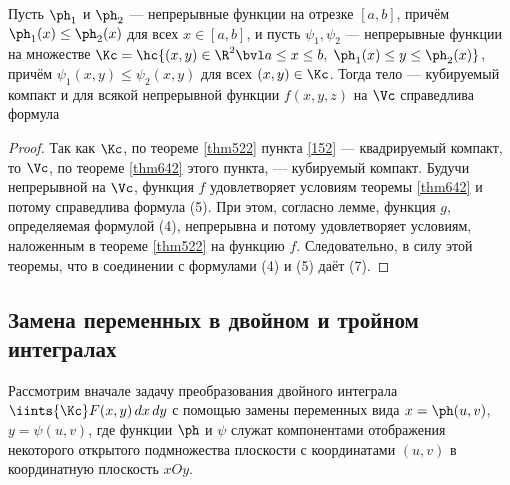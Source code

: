\documentclass[a4paper]{article}
\begin{document}
\begin{theorem}
Пусть $\ph_1$ и $\ph_2$ --- непрерывные функции на отрезке $[a,b]$,
причём $\ph_1(x)\le\ph_2(x)$ для всех $x\in[a,b]$, и пусть
$\psi_1,\psi_2$ --- непрерывные функции на множестве
$\Kc=\hc{(x,y)\in\R^2 \bvl a\le x\le b, \; \ph_1(x)\le
y\le\ph_2(x)}$, причём $\psi_1(x,y)\le\psi_2(x,y)$ для всех
$(x,y)\in\Kc$. Тогда тело 
--- кубируемый компакт и для всякой непрерывной функции $f(x,y,z)$
на $\Vc$ справедлива формула
\end{theorem}

\begin{proof}
Так как $\Kc$, по теореме \ref{thm522} пункта \ref{152} ---
квадрируемый компакт, то $\Vc$, по теореме \ref{thm642} этого
пункта, --- кубируемый компакт. Будучи непрерывной на $\Vc$, функция
$f$ удовлетворяет условиям теоремы \ref{thm642} и потому справедлива
формула (5). При этом, согласно лемме, функция $g$, определяемая
формулой (4), непрерывна и потому удовлетворяет условиям, наложенным
в теореме \ref{thm522} на функцию $f$. Следовательно, в силу этой
теоремы,  что в соединении с
формулами (4) и (5) даёт (7).
\end{proof}

\subsection{Замена переменных в двойном и тройном интегралах}

Рассмотрим вначале задачу преобразования двойного интеграла
$\iints{\Kc}F(x,y)\,dx\,dy$ с помощью замены переменных вида
$x=\ph(u,v)$, $y=\psi(u,v)$, где функции $\ph$ и $\psi$ служат
компонентами отображения некоторого открытого подмножества плоскости
с координатами $(u,v)$ в координатную плоскость $xOy$.
\end{document}

